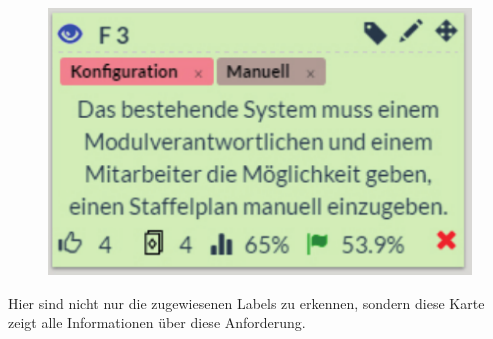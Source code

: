 \begin{figure}[!htb]
		\includegraphics[width=.5\textwidth]{images/anforderung.pdf}
\centering 
{} 
\label{fig:anforderung}
\end{figure}

Hier sind nicht nur die zugewiesenen Labels zu erkennen, sondern diese Karte zeigt alle Informationen über diese Anforderung. 


